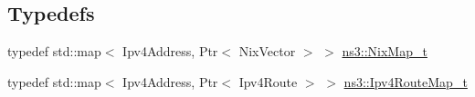 \subsection*{Typedefs}
\begin{DoxyCompactItemize}
\item 
typedef std\+::map$<$ Ipv4\+Address, Ptr$<$ Nix\+Vector $>$ $>$ \hyperlink{group__nix-vector-routing_gaa552b6157fc91cb632b9007a4cef9bc7}{ns3\+::\+Nix\+Map\+\_\+t}
\item 
typedef std\+::map$<$ Ipv4\+Address, Ptr$<$ Ipv4\+Route $>$ $>$ \hyperlink{group__nix-vector-routing_ga0a2084e70cce2de3dcfab5da0ec63bdd}{ns3\+::\+Ipv4\+Route\+Map\+\_\+t}
\end{DoxyCompactItemize}
